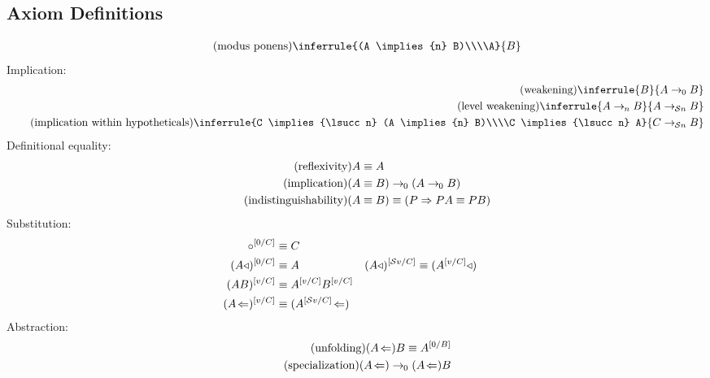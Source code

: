 \documentclass{article}
\begin{document}
  \subsection{Axiom Definitions}
  \setlength{\jot}{1.4em}
  \begin{gather*}
    \tag{modus ponens}\label{mp}
    \inferrule{(A \implies{n} B)\\\\A}{B}\\
  \end{gather*}
  Implication:
  \begin{align*}
    \tag{weakening}
    \inferrule{B}{A \implies{\lzero} B}\\
    \tag{level weakening}
    \inferrule{A \implies{n} B}{A \implies{\lsucc n} B}\\
    \tag{implication within hypotheticals}
    \inferrule{C \implies{\lsucc n} (A \implies{n} B)\\\\C \implies{\lsucc n} A}{C \implies{\lsucc n} B}\\
  \end{align*}
  \setlength{\jot}{0.4em}
  Definitional equality:
  \begin{align*}
    \tag{reflexivity}\label{eq_refl}
    A &\equiv A\\
    \tag{implication}
    (A &\equiv B) \rightarrow_{\hspace{-0.04em}0} (A \rightarrow_{\hspace{-0.04em}0} B)\\
    \tag{indistinguishability}\label{eq_indis}
    (A &\equiv B) \equiv (P \Rightarrow PA \equiv PB)\\
  \end{align*}
  Substitution:
  \begin{align*}
    \circ^{[{0}{/}{C}]} &\equiv C\\
    (A\triangleleft)^{[{0}{/}{C}]} &\equiv A & (A\triangleleft)^{[{\mathcal{S} v}{/}{C}]} &\equiv (A^{[{v}{/}{C}]}\triangleleft)\\
    (AB)^{[{v}{/}{C}]} &\equiv A^{[{v}{/}{C}]}B^{[{v}{/}{C}]}\\
    (A\!\Leftarrow)^{[{v}{/}{C}]} &\equiv (A^{[{\mathcal{S} v}{/}{C}]}\!\Leftarrow)\\
  \end{align*}
  Abstraction:
  \begin{align*}
    \tag{unfolding}
    (A\!\Leftarrow)B \equiv A^{[{0}{/}{B}]}\\
    \tag{specialization}\label{specialization}
    (A\!\Leftarrow) \rightarrow_{\hspace{-0.04em}0} (A\!\Leftarrow)B\\
  \end{align*}
\end{document}
